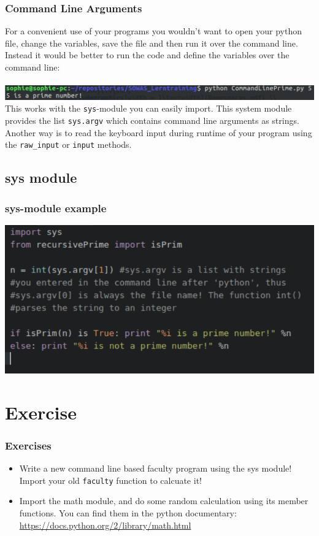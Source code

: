 \documentclass{beamer}
\begin{document}
\begin{frame}
\frametitle{Command Line Arguments}
	For a convenient use of your programs you wouldn't want to open your python file, change the variables, save the file and then run it over the command line. Instead it would be better to run the code and define the variables over the command line: \\ $\,$ \\
	\includegraphics[width = 1\textwidth]{CommandLinePrime.pdf} \\
	This works with the \texttt{sys}-module you can easily import. This system module provides the list \texttt{sys.argv} which contains command line arguments as strings. \\ Another way is to read the keyboard input during runtime of your program using the \texttt{raw\_input} or \texttt{input} methods.
\end{frame}

\subsection{sys module}

\begin{frame}
\frametitle{sys-module example}
	\includegraphics[width = 1\textwidth]{SysExample.pdf} 
\end{frame}

\section{Exercise}

\begin{frame}
\frametitle{Exercises}
	\begin{itemize}
		\item Write a new command line based faculty program using the sys module! Import your old \texttt{faculty} function to calcuate it!
		\item Import the math module, and do some random calculation using its member functions. You can find them in the python documentary: \url{https://docs.python.org/2/library/math.html}
	\end{itemize}
\end{frame}
\end{document}
